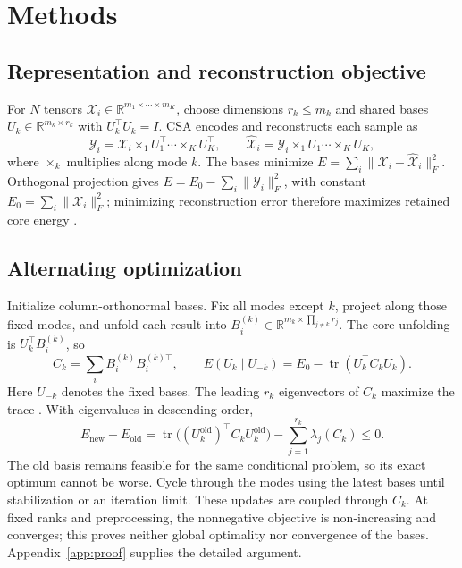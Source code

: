 \section{Methods}
\label{sec:methods}
\subsection{Representation and reconstruction objective}
For $N$ tensors $\mathcal X_i\in\mathbb R^{m_1\times\cdots\times m_K}$,
choose dimensions $r_k\leq m_k$ and shared bases
$U_k\in\mathbb R^{m_k\times r_k}$ with $U_k^\top U_k=I$.
CSA encodes and reconstructs each sample as
\begin{equation}
\mathcal Y_i=\mathcal X_i\times_1U_1^\top\cdots\times_KU_K^\top,
\qquad \widehat{\mathcal X}_i=\mathcal Y_i\times_1U_1\cdots\times_KU_K,
\label{eq:encoding}
\end{equation}
where $\times_k$ multiplies along mode $k$. The bases minimize
$E=\sum_i\|\mathcal X_i-\widehat{\mathcal X}_i\|_F^2$.
Orthogonal projection gives
$E=E_0-\sum_i\|\mathcal Y_i\|_F^2$, with constant
$E_0=\sum_i\|\mathcal X_i\|_F^2$; minimizing reconstruction error therefore
maximizes retained core energy \citep[Sec.~II-B]{xu2008csa}.

\subsection{Alternating optimization}
Initialize column-orthonormal bases. Fix all modes except $k$, project along
those fixed modes, and unfold each result into
$B_i^{(k)}\in\mathbb R^{m_k\times\prod_{j\ne k}r_j}$.
The core unfolding is $U_k^\top B_i^{(k)}$, so
\begin{equation}
C_k=\sum_iB_i^{(k)}B_i^{(k)\top},\qquad
E(U_k\mid U_{-k})=E_0-\operatorname{tr}(U_k^\top C_kU_k).
\label{eq:conditional}
\end{equation}
Here $U_{-k}$ denotes the fixed bases. The leading $r_k$ eigenvectors of $C_k$ maximize the trace
\citep[Theorem~1]{xu2008csa}. With eigenvalues in descending order,
\begin{equation}
E_{\mathrm{new}}-E_{\mathrm{old}}
=\operatorname{tr}\!\bigl((U_k^{\mathrm{old}})^\top C_kU_k^{\mathrm{old}}\bigr)
-\sum_{j=1}^{r_k}\lambda_j(C_k)\leq0.
\label{eq:nonincrease}
\end{equation}
The old basis remains feasible for the same conditional problem, so its exact
optimum cannot be worse. Cycle through the modes using the latest bases until
stabilization or an iteration limit. These updates are coupled through $C_k$.
At fixed ranks and preprocessing, the nonnegative objective is non-increasing
and converges; this proves neither global optimality nor convergence of the
bases. Appendix~\ref{app:proof} supplies the detailed argument.

